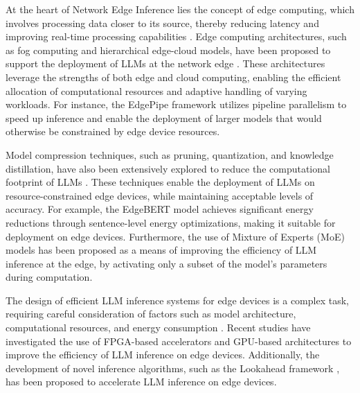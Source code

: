 \documentclass[11pt,a4paper]{article}
\begin{document}
At the heart of Network Edge Inference lies the concept of edge computing, which involves processing data closer to its source, thereby reducing latency and improving real-time processing capabilities \cite{doi:10.1109/comst.2025.3527641}. Edge computing architectures, such as fog computing and hierarchical edge-cloud models, have been proposed to support the deployment of LLMs at the network edge \cite{doi:10.3390/electronics12173598}. These architectures leverage the strengths of both edge and cloud computing, enabling the efficient allocation of computational resources and adaptive handling of varying workloads. For instance, the EdgePipe framework \cite{arxiv:2110.14895} utilizes pipeline parallelism to speed up inference and enable the deployment of larger models that would otherwise be constrained by edge device resources.

Model compression techniques, such as pruning, quantization, and knowledge distillation, have also been extensively explored to reduce the computational footprint of LLMs \cite{doi:10.1609/aaai.v37i9.26255}. These techniques enable the deployment of LLMs on resource-constrained edge devices, while maintaining acceptable levels of accuracy. For example, the EdgeBERT model \cite{doi:10.1145/3466752.3480095} achieves significant energy reductions through sentence-level energy optimizations, making it suitable for deployment on edge devices. Furthermore, the use of Mixture of Experts (MoE) models \cite{doi:10.1145/3676536.3676741} has been proposed as a means of improving the efficiency of LLM inference at the edge, by activating only a subset of the model's parameters during computation.

The design of efficient LLM inference systems for edge devices is a complex task, requiring careful consideration of factors such as model architecture, computational resources, and energy consumption \cite{arxiv:2408.00462}. Recent studies have investigated the use of FPGA-based accelerators \cite{arxiv:2408.00462} and GPU-based architectures \cite{arxiv:2406.06282} to improve the efficiency of LLM inference on edge devices. Additionally, the development of novel inference algorithms, such as the Lookahead framework \cite{doi:10.1145/3637528.3671614}, has been proposed to accelerate LLM inference on edge devices.
\end{document}
